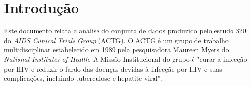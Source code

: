 \documentclass[
	12pt,				%
	openright,			%
	twoside,			%
	a4paper,			%
	english,			%
	brazil				%
	]{abntex2}
\begin{document}

  





\tableofcontents*
\cleardoublepage



\textual

\chapter*[Introdução]{Introdução}
Este documento relata a análise do conjunto de dados produzido pelo estudo 320 do \textit{AIDS Clinical Trials Group} (ACTG). O ACTG é um grupo de trabalho multidisciplinar estabelecido em 1989 pela pesquisadora Maureen Myers do \textit{National Institutes of Health}. A Missão Institucional do grupo é "curar a infecção por HIV e reduzir o fardo das doenças devidas à infecção por HIV e suas complicações, incluindo tuberculose e hepatite viral".  
\end{document}
